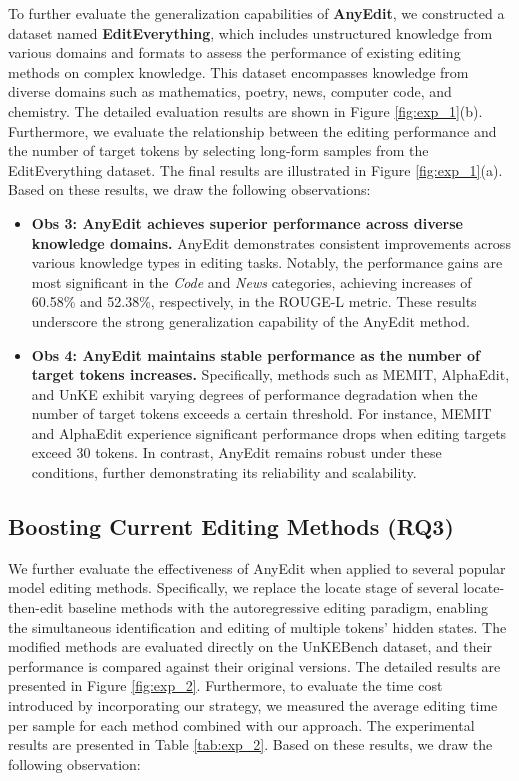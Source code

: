 To further evaluate the generalization capabilities of \textbf{AnyEdit}, we constructed a dataset named \textbf{EditEverything}, which includes unstructured knowledge from various domains and formats to assess the performance of existing editing methods on complex knowledge. This dataset encompasses knowledge from diverse domains such as mathematics, poetry, news, computer code, and chemistry. The detailed evaluation results are shown in Figure \ref{fig:exp_1}(b). Furthermore, we evaluate the relationship between the editing performance and the number of target tokens by selecting long-form samples from the EditEverything dataset. The final results are illustrated in Figure \ref{fig:exp_1}(a). Based on these results, we draw the following observations:
\begin{itemize}[leftmargin=*]
    \item \textbf{Obs 3: AnyEdit achieves superior performance across diverse knowledge domains.}  
    AnyEdit demonstrates consistent improvements across various knowledge types in editing tasks. Notably, the performance gains are most significant in the \textit{Code} and \textit{News} categories, achieving increases of 60.58\% and 52.38\%, respectively, in the ROUGE-L metric. These results underscore the strong generalization capability of the AnyEdit method.

    \item \textbf{Obs 4: AnyEdit maintains stable performance as the number of target tokens increases.}  
    Specifically, methods such as MEMIT, AlphaEdit, and UnKE exhibit varying degrees of performance degradation when the number of target tokens exceeds a certain threshold. For instance, MEMIT and AlphaEdit experience significant performance drops when editing targets exceed 30 tokens. In contrast, AnyEdit remains robust under these conditions, further demonstrating its reliability and scalability.
\end{itemize}


\subsection{Boosting Current Editing Methods  (RQ3)} 

We further evaluate the effectiveness of AnyEdit when applied to several popular model editing methods. Specifically, we replace the locate stage of several locate-then-edit baseline methods with the  autoregressive editing paradigm, enabling the simultaneous identification and editing of multiple tokens' hidden states. The modified methods are evaluated directly on the UnKEBench dataset, and their performance is compared against their original versions. The detailed results are presented in Figure \ref{fig:exp_2}. Furthermore, to evaluate the time cost introduced by incorporating our strategy, we measured the average editing time per sample for each method combined with our approach. The experimental results are presented in Table \ref{tab:exp_2}. Based on these results, we draw the following observation:

